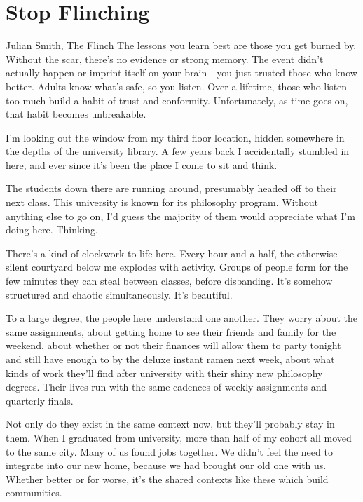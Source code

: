 \documentclass[../the-millions-of-gestures.tex]{subfiles}
\begin{document}
\chapter{Stop Flinching}

\begin{aquote}{Julian Smith, The Flinch}
  The lessons you learn best are those you get burned by.  Without the scar,
  there’s no evidence or strong memory. The event didn’t actually happen or
  imprint itself on your brain—you just trusted those who know better. Adults
  know what’s safe, so you listen. Over a lifetime, those who listen too much
  build a habit of trust and conformity. Unfortunately, as time goes on, that
  habit becomes unbreakable.
\end{aquote}

 I'm looking out the window from my third floor
location, hidden somewhere in the depths of the university library. A few years
back I accidentally stumbled in here, and ever since it's been the place I come
to sit and think.

The students down there are running around, presumably headed off to their next
class. This university is known for its philosophy program. Without anything
else to go on, I'd guess the majority of them would appreciate what I'm doing
here. Thinking.

There's a kind of clockwork to life here. Every hour and a half, the otherwise
silent courtyard below me explodes with activity. Groups of people form for the
few minutes they can steal between classes, before disbanding. It's somehow
structured and chaotic simultaneously. It's beautiful.

To a large degree, the people here understand one another. They worry about the
same assignments, about getting home to see their friends and family for the
weekend, about whether or not their finances will allow them to party tonight
and still have enough to by the deluxe instant ramen next week, about what kinds
of work they'll find after university with their shiny new philosophy degrees.
Their lives run with the same cadences of weekly assignments and quarterly
finals.

Not only do they exist in the same context now, but they'll probably stay in
them. When I graduated from university, more than half of my cohort all moved to
the same city. Many of us found jobs together. We didn't feel the need to
integrate into our new home, because we had brought our old one with us. Whether
better or for worse, it's the shared contexts like these which build
communities.
\end{document}

